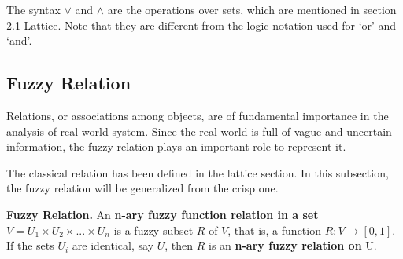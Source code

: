 The syntax $\vee$ and $\wedge$ are the operations over sets, which are mentioned in section 2.1 Lattice. Note that they are different from the logic notation used for `or' and `and'. 

\subsection{Fuzzy Relation}
\label{sec:FuzzyRelation}
Relations, or associations among objects, are of fundamental importance in the analysis of real-world system. Since the real-world is full of vague and uncertain information, the fuzzy relation plays an important role to represent it.

The classical relation has been defined in the lattice section. In this subsection, the fuzzy relation will be generalized from the crisp one.

\begin{defin} \textbf{Fuzzy Relation.}
\label{def:FuzzyRelation}
An \textbf{n-ary fuzzy function relation in a set} $V = U_1 \times U_2 \times ... \times U_n$ is a fuzzy subset $R$ of $V$, that is, a function $R : V \rightarrow [0,1]$. If the sets $U_i$ are identical, say $U$, then $R$ is an \textbf{n-ary fuzzy relation on} U.
 
\end{defin}